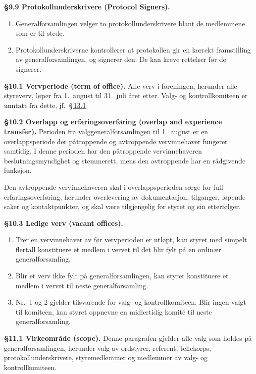 \documentclass{../../../Common/Latex/Templates/rapport}
\begin{document}
\textbf{\S 9.9 Protokollunderskrivere (Protocol Signers).}\label{nbylaw:9.9}
\begin{enumerate}
  \item Generalforsamlingen velger to protokollunderskrivere blant de medlemmene som er til stede.
  \item Protokollunderskriverne kontrollerer at protokollen gir en korrekt framstilling av generalforsamlingen, og signerer den. De kan kreve rettelser før de signerer.
\end{enumerate}

\label{nbylaw:10}
\textbf{\S 10.1 Vervperiode (term of office).}\label{nbylaw:10.1} Alle verv i foreningen, herunder alle styreverv, løper fra 1.\ august til 31.\ juli \r{a}ret etter. Valg- og kontrollkomiteen er unntatt fra dette, jf.\ \hyperref[nbylaw:13.1]{\S\,13.1}.

\textbf{\S 10.2 Overlapp og erfaringsoverføring (overlap and experience transfer).}\label{nbylaw:10.2} Perioden fra valggeneralforsamlingen til 1.\ august er en overlappsperiode der p\r{a}troppende og avtroppende vervinnehaver fungerer samtidig. I denne perioden har den p\r{a}troppende vervinnehaveren beslutningsmyndighet og stemmerett, mens den avtroppende har en r\r{a}dgivende funksjon.

Den avtroppende vervinnehaveren skal i overlappsperioden sørge for full erfaringsoverføring, herunder overlevering av dokumentasjon, tilganger, løpende saker og kontaktpunkter, og skal være tilgjengelig for styret og sin etterfølger.

\textbf{\S 10.3 Ledige verv (vacant offices).}\label{nbylaw:10.3}
\begin{enumerate}
  \item Trer en vervinnehaver av før vervperioden er utløpt, kan styret med simpelt flertall konstituere et medlem i vervet til det blir fylt p\r{a} en ordinær generalforsamling.
  \item Blir et verv ikke fylt p\r{a} generalforsamlingen, kan styret konstituere et medlem i vervet til neste generalforsamling.
  \item Nr.\ 1 og 2 gjelder tilsvarende for valg- og kontrollkomiteen. Blir ingen valgt til komiteen, kan styret oppnevne en midlertidig komit\'e til neste generalforsamling.
\end{enumerate}

\label{nbylaw:11}
\textbf{\S 11.1 Virkeomr\r{a}de (scope).}\label{nbylaw:11.1} Denne paragrafen gjelder alle valg som holdes p\r{a} generalforsamlingen, herunder valg av ordstyrer, referent, tellekorps, protokollunderskrivere, styremedlemmer og medlemmer av valg- og kontrollkomiteen.
\end{document}
